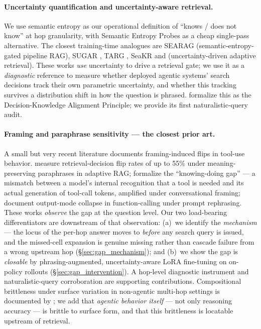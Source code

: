 \documentclass[10pt,letterpaper]{article}
\begin{document}
\paragraph{Uncertainty quantification and uncertainty-aware retrieval.}
We use semantic entropy \citep{farquhar2024,evidential2026} as our operational
definition of ``knows / does not know'' at hop granularity, with Semantic Entropy
Probes \citep{sep2024} as a cheap single-pass alternative. The closest training-time
analogues are SEARAG \citep{searag2025} (semantic-entropy-gated pipeline RAG),
SUGAR \citep{sugar2025}, TARG \citep{targ2026}, SeaKR \citep{seakr2025} and
\citet{betaGRPO2025} (uncertainty-driven adaptive retrieval). These works \emph{use}
uncertainty to drive a retrieval gate; we use it as a \emph{diagnostic} reference to
measure whether deployed agentic systems' search decisions track their own
parametric uncertainty, and whether this tracking survives a distribution shift in
how the question is phrased. \citet{towardtheory2025} formalize this as the
Decision-Knowledge Alignment Principle; we provide its first naturalistic-query
audit.

\paragraph{Framing and paraphrase sensitivity --- the closest prior art.}
A small but very recent literature documents framing-induced flips in tool-use
behavior. \citet{howask2026} measure retrieval-decision flip rates of up to 55\%
under meaning-preserving paraphrases in adaptive RAG; \citet{knowingdoing2026}
formalize the ``knowing-doing gap'' --- a mismatch between a model's internal
recognition that a tool is needed and its actual generation of tool-call tokens,
amplified under conversational framing; \citet{rabinovich2025agentic} document
output-mode collapse in function-calling under prompt rephrasing. These works
\emph{observe} the gap at the question level. Our two load-bearing differentiators
are downstream of that observation: (a)~we identify the \emph{mechanism} --- the
locus of the per-hop answer moves to \emph{before} any search query is issued, and
the missed-cell expansion is genuine missing rather than cascade failure from a
wrong upstream hop (\S\ref{sec:gap_mechanism}); and (b)~we show the gap is
\emph{closable} by phrasing-augmented, uncertainty-aware LoRA fine-tuning on
on-policy rollouts (\S\ref{sec:gap_intervention}). A hop-level diagnostic
instrument and naturalistic-query corroboration are supporting contributions.
Compositional brittleness under surface variation in non-agentic multi-hop settings
is documented by \citet{li2024patching,yang2024latent,wu2024mrke}; we add that
\emph{agentic behavior itself} --- not only reasoning accuracy --- is brittle to
surface form, and that this brittleness is locatable upstream of retrieval.
\end{document}

